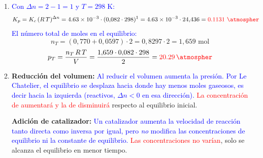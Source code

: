 \begin{exerciseEVAU}
\begin{solu}
\begin{enumerate}[label=\letraminuscula]
        \item \textcolor{blue}{Con \(\Delta n = 2 - 1 = 1\) y \(T = 298\) K:}
        \[
            K_p = K_c\,(R\,T)^{\Delta n} = \num{4{,}63e-3}\cdot(0{,}082\cdot298)^1 = \num{4{,}63e-3}\cdot24{,}436 = \textcolor{red}{\num{0{,}1131}\ \unit{\atmospher}}
        \]
        \textcolor{blue}{El número total de moles en el equilibrio:}
        \[
            n_T = (0{,}770 + 0{,}0597)\cdot2 = 0{,}8297\cdot2 = 1{,}659 \text{ mol}
        \]
        \[
            p_T = \frac{n_T\,R\,T}{V} = \frac{1{,}659\cdot0{,}082\cdot298}{2} = \textcolor{red}{\qty{20{,}29}{\atmospher}}
        \]

        \item \textbf{Reducción del volumen:} \textcolor{blue}{Al reducir el volumen aumenta la presión. Por Le Chatelier, el equilibrio se desplaza hacia donde hay menos moles gaseosos, es decir hacia la izquierda (reactivos, \(\Delta n < 0\) en esa dirección).} \textcolor{red}{La concentración de  aumentará y la de  disminuirá} respecto al equilibrio inicial.

        \textbf{Adición de catalizador:} \textcolor{blue}{Un catalizador aumenta la velocidad de reacción tanto directa como inversa por igual, pero \emph{no} modifica las concentraciones de equilibrio ni la constante de equilibrio.} \textcolor{red}{Las concentraciones no varían}, solo se alcanza el equilibrio en menor tiempo.
    \end{enumerate}

    \end{solu}
\end{exerciseEVAU}


